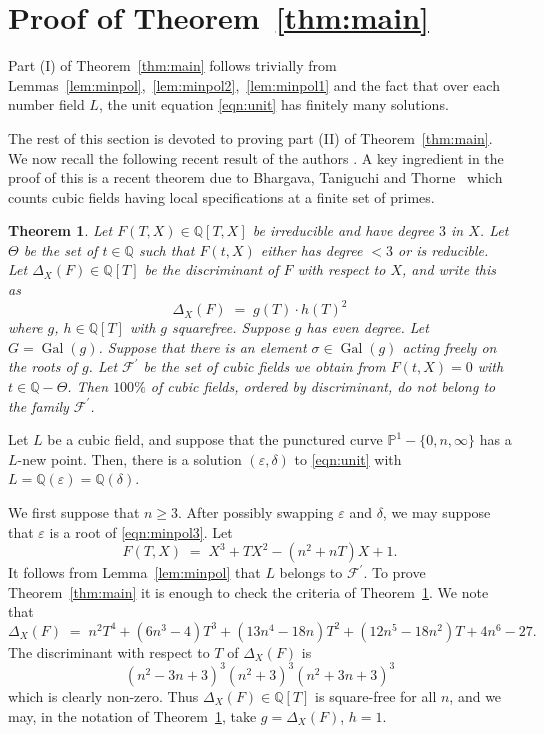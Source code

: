\documentclass{amsart}
\newcommand{\PP}{\mathbb{P}}
\newcommand{\Q}{\mathbb{Q}}
\newcommand{\cF}{\mathcal{F}}
\DeclareMathOperator{\Gal}{Gal}
\renewcommand{\setminus}{-}
\newtheorem{thm}{Theorem}
\theoremstyle{definition}
\theoremstyle{remark}
\begin{document}
\section{Proof of Theorem~\ref{thm:main}}
Part (I) of Theorem~\ref{thm:main} follows trivially from
Lemmas~\ref{lem:minpol},~\ref{lem:minpol2},~\ref{lem:minpol1}
and the fact that over each number field $L$, the unit equation \eqref{eqn:unit}
has finitely many solutions. 

\medskip

The rest of this section is devoted to proving part (II) of Theorem~\ref{thm:main}.
We now recall the following recent result of the authors \cite[Corollary 19]{KS_stab}. 
A key ingredient in the proof of this is a 
recent theorem due to Bhargava, Taniguchi and Thorne~\cite[Theorem 1.3]{BTT} 
which counts cubic fields having local specifications 
at a finite set of primes.

\begin{thm}\label{thm:sparsecubics}
	Let $F(T,X) \in \Q[T,X]$ be irreducible and have degree $3$ in $X$. 
		Let $\Theta$ be the set of $t \in \Q$ such that $F(t,X)$ 
		either has degree $<3$ or is reducible.
	Let $\Delta_X(F) \in \Q[T]$
	be the discriminant of $F$ with respect to $X$, and write this as
	\[
			\Delta_X(F) \; = \; g(T) \cdot h(T)^2
	\]
	where $g$, $h \in \Q[T]$ with $g$ squarefree.
	Suppose $g$ has even degree. Let $G=\Gal(g)$. Suppose that there is an element $\sigma \in \Gal(g)$
	acting freely on the roots of $g$. Let $\cF^\prime$ be the set of cubic fields
	we obtain from $F(t,X)=0$ with $t \in \Q \setminus \Theta$.
	Then $100\%$ of cubic fields, ordered by discriminant,
	do not belong to the family $\cF^\prime$.
\end{thm}

Let $L$ be a cubic field, and
suppose that the punctured curve $\PP^1\setminus \{0,n,\infty\}$
has a $L$-new point.
Then, there is a solution $(\varepsilon,\delta)$ to \eqref{eqn:unit}
with $L=\Q(\varepsilon)=\Q(\delta)$. 

We first suppose that $n \ge 3$. 
After possibly swapping
$\varepsilon$ and $\delta$, we may suppose that $\varepsilon$
is a root of \eqref{eqn:minpol3}. Let
\[
	F(T,X)\; = \; X^3+T X^2-(n^2+nT)X+1.
\]
It follows from Lemma~\ref{lem:minpol} that $L$ belongs to 
$\cF^\prime$. To prove Theorem~\ref{thm:main} it is enough
to check the criteria of Theorem~\ref{thm:sparsecubics}.
We note that 
\[
	\Delta_X(F) \; = \; 
	n^2 T^4 + (6 n^3 - 4) T^3 + (13 n^4 - 18 n) T^2 + (12 n^5 - 18 n^2) T + 4 n^6 - 27.
\]
The discriminant with respect to $T$ of $\Delta_X(F)$ is
\[ (n^2 - 3 n + 3)^3
    (n^2 + 3)^3
    (n^2 + 3 n + 3)^3
\]
which is clearly non-zero. Thus $\Delta_X(F) \in \Q[T]$ is square-free
for all $n$, and we may, in the notation of Theorem~\ref{thm:sparsecubics},
take $g=\Delta_X(F)$, $h=1$.
\end{document}

